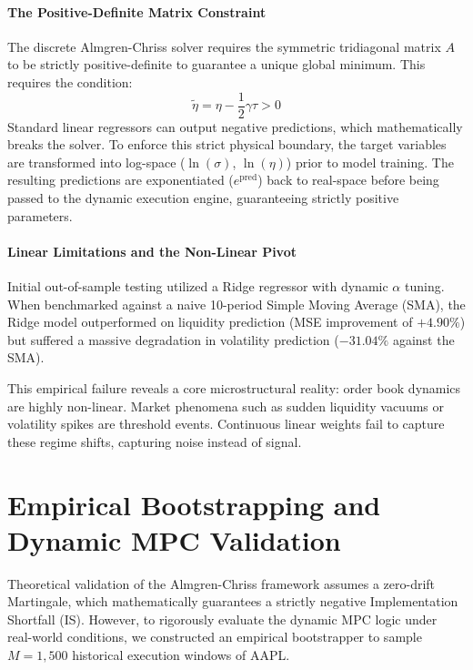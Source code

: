 \documentclass[11pt,a4paper]{article}
\begin{document}
\paragraph{The Positive-Definite Matrix Constraint}
The discrete Almgren-Chriss solver requires the symmetric tridiagonal matrix $A$ to be strictly positive-definite to guarantee a unique global minimum. This requires the condition:
\[ \tilde{\eta} = \eta - \frac{1}{2}\gamma\tau > 0 \]
Standard linear regressors can output negative predictions, which mathematically breaks the solver. To enforce this strict physical boundary, the target variables are transformed into log-space ($\ln(\sigma)$, $\ln(\eta)$) prior to model training. The resulting predictions are exponentiated ($e^{\text{pred}}$) back to real-space before being passed to the dynamic execution engine, guaranteeing strictly positive parameters.

\paragraph{Linear Limitations and the Non-Linear Pivot}
Initial out-of-sample testing utilized a Ridge regressor with dynamic $\alpha$ tuning. When benchmarked against a naive 10-period Simple Moving Average (SMA), the Ridge model outperformed on liquidity prediction (MSE improvement of $+4.90\%$) but suffered a massive degradation in volatility prediction ($-31.04\%$ against the SMA). 

This empirical failure reveals a core microstructural reality: order book dynamics are highly non-linear. Market phenomena such as sudden liquidity vacuums or volatility spikes are threshold events. Continuous linear weights fail to capture these regime shifts, capturing noise instead of signal. 

\section{Empirical Bootstrapping and Dynamic MPC Validation}

Theoretical validation of the Almgren-Chriss framework assumes a zero-drift Martingale, which mathematically guarantees a strictly negative Implementation Shortfall (IS). However, to rigorously evaluate the dynamic MPC logic under real-world conditions, we constructed an empirical bootstrapper to sample $M=1,500$ historical execution windows of AAPL.
\end{document}
